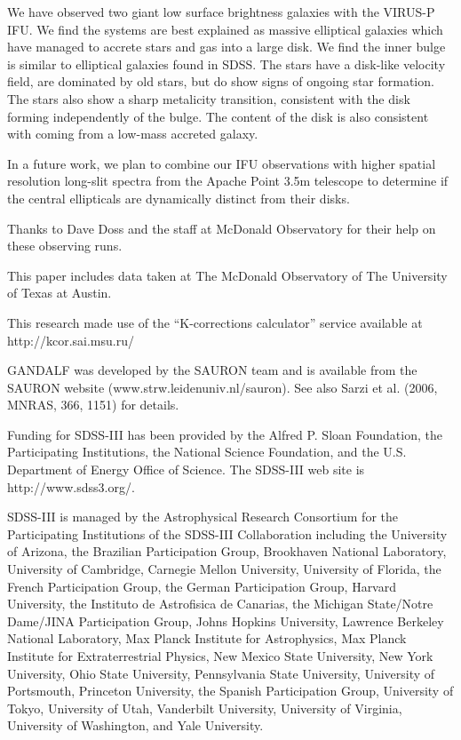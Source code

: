 \documentclass[12pt,preprint]{aastex}
\newcommand\HI{\ion{H}{1}}
\begin{document}
We have observed two giant low surface brightness galaxies with the VIRUS-P IFU.  We find the systems are best explained as massive elliptical galaxies which have managed to accrete stars and gas into a large disk.  We find the inner bulge is similar to elliptical galaxies found in SDSS.  The stars have a disk-like velocity field, are dominated by old stars, but do show signs of ongoing star formation. The stars also show a sharp metalicity transition, consistent with the disk forming independently of the bulge. The \HI content of the disk is also consistent with coming from a low-mass accreted galaxy.

In a future work, we plan to combine our IFU observations with higher spatial resolution long-slit spectra from the Apache Point 3.5m telescope to determine if the central ellipticals are dynamically distinct from their disks.  

\acknowledgments
Thanks to Dave Doss and the staff at McDonald Observatory for their help on these observing runs. 

This paper includes data taken at The McDonald Observatory of The University of Texas at Austin.


This research made use of the ``K-corrections calculator'' service available at http://kcor.sai.msu.ru/

GANDALF was developed by the SAURON team and is available from the SAURON website (www.strw.leidenuniv.nl/sauron). See also Sarzi et al. (2006, MNRAS, 366, 1151) for details.

Funding for SDSS-III has been provided by the Alfred P. Sloan Foundation, the Participating Institutions, the National Science Foundation, and the U.S. Department of Energy Office of Science. The SDSS-III web site is http://www.sdss3.org/.

SDSS-III is managed by the Astrophysical Research Consortium for the Participating Institutions of the SDSS-III Collaboration including the University of Arizona, the Brazilian Participation Group, Brookhaven National Laboratory, University of Cambridge, Carnegie Mellon University, University of Florida, the French Participation Group, the German Participation Group, Harvard University, the Instituto de Astrofisica de Canarias, the Michigan State/Notre Dame/JINA Participation Group, Johns Hopkins University, Lawrence Berkeley National Laboratory, Max Planck Institute for Astrophysics, Max Planck Institute for Extraterrestrial Physics, New Mexico State University, New York University, Ohio State University, Pennsylvania State University, University of Portsmouth, Princeton University, the Spanish Participation Group, University of Tokyo, University of Utah, Vanderbilt University, University of Virginia, University of Washington, and Yale University.
\end{document}
